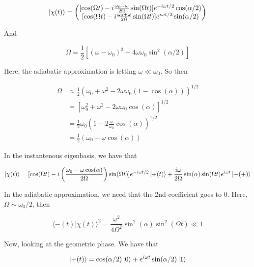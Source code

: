 \documentclass{article}
\newtheorem{one minute paper}[theorem]{One Minute Paper}
\begin{document}
\begin{equation}
    \ket{\chi(t)} = \begin{pmatrix}
        [\cos(\Omega t) - i\frac{\omega_0 - \omega}{2\Omega}\sin(\Omega t)]e^{-i\omega t/2}\cos(\alpha/2)\\
        [\cos(\Omega t) - i\frac{\omega_0 + \omega}{2\Omega}\sin(\Omega t)]e^{i\omega t/2}\sin(\alpha/2)
    \end{pmatrix}
\end{equation}

And 

\begin{equation}
    \Omega = \frac{1}{2}\left[ \left( \omega - \omega_0 \right)^2 + 4\omega \omega_0 \sin^2(\alpha/2) \right]
\end{equation}

Here, the adiabatic approximation is letting $\omega \ll \omega_0$. So then 

\begin{align*}
    \Omega &\approx \frac{1}{2}\left( \omega_0 + \omega^2 - 2\omega\omega_0 \left( 1 - \cos(\alpha) \right) \right)^{1/2} \\
    &= \left[ \omega_0^2 + \omega^2 - 2\omega \omega_0 \cos(\alpha) \right]^{1/2} \\
    &= \frac{1}{2}\omega_0\left( 1 - 2\frac{\omega}{\omega_0}\cos(\alpha) \right)^{1/2} \\
    &= \frac{1}{2}\left( \omega_0 - \omega \cos(\alpha) \right)
\end{align*}

In the instantenous eigenbasis, we have that 

\begin{equation}
    \ket{\chi(t)} = [\cos(\Omega t) - i\left( \frac{\omega_0 - \omega \cos(\alpha)}{2\Omega} \right)\sin(\Omega t)]e^{-i \omega t/2}\ket{+(t)} + \frac{i \omega}{2\Omega}\sin(\alpha)\sin(\Omega t)e^{i \omega t}\ket{-(+)}
\end{equation}

In the adiabatic approximation, we need that the 2nd coefficient goes to $0$. Here, $\Omega \sim \omega_0/2$, then 

\begin{equation}
    \langle -(t) | \chi(t) \rangle ^2 = \frac{\omega^2}{4\Omega^2}\sin^2(\alpha)\sin^2(\Omega t) \ll 1
\end{equation}

Now, looking at the geometric phase. We have that 

\begin{equation}
    \ket{+(t)} = \cos(\alpha/2)\ket{0} + e^{i \omega t}\sin(\alpha/2)\ket{1}
\end{equation}
\end{document}
